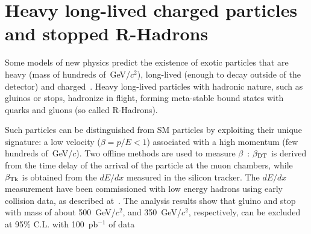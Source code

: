 \documentclass{PoS}
\begin{document}
\section{Heavy long-lived charged particles and stopped R-Hadrons} \label{HSCP}
Some models of new physics predict the existence 
of exotic particles that are heavy (mass of hundreds of~GeV/$c^2$), 
long-lived (enough to decay outside of the detector) and charged~\cite{Fairbairn:2006gg}. 
Heavy long-lived particles with hadronic nature, such as gluinos or stops, 
hadronize in flight, forming meta-stable bound states with quarks and gluons (so called R-Hadrons).

Such particles can be distinguished from SM particles
by exploiting their unique signature: a low velocity ($\beta=p/E<1$) 
associated with a high momentum (few hundreds of~GeV/$c$).
Two offline methods are used to measure $\beta$~\cite{HSCP}:
$\beta_{{\rm DT}}$ is derived from the time delay of the arrival of the particle
at the muon chambers, while $\beta_{{\rm Tk}}$ is obtained from the $dE/dx$ 
measured in the silicon tracker.
The $dE/dx$ measurement have been commissioned with low energy hadrons 
using early collision data, as described at~\cite{TRACKERPAS}.
The analysis results show that gluino and stop 
with mass of about 500~GeV/$c^2$, and 350~GeV/$c^2$, 
respectively, can be excluded at 95\% C.L. with 100~pb$^{-1}$ of data
\end{document}
